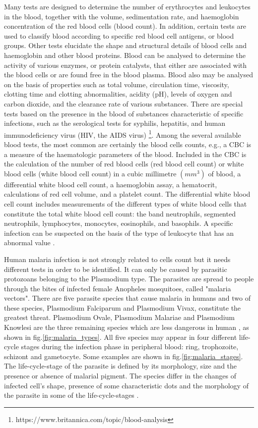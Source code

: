 \documentclass[sensors,review,submit,moreauthors,pdftex,10pt,a4paper]{mdpi}
\begin{document}
Many tests are designed to determine the number of erythrocytes and leukocytes in the blood, together with the volume, sedimentation rate, and haemoglobin concentration of the red blood cells (blood count). In addition, certain tests are used to classify blood according to specific red blood cell antigens, or blood groups. Other tests elucidate the shape and structural details of blood cells and haemoglobin and other blood proteins. Blood can be analysed to determine the activity of various enzymes, or protein catalysts, that either are associated with the blood cells or are found free in the blood plasma.
Blood also may be analysed on the basis of properties such as total volume, circulation time, viscosity, clotting time and clotting abnormalities, acidity (pH), levels of oxygen and carbon dioxide, and the clearance rate of various substances. There are special tests based on the presence in the blood of substances characteristic of specific infections, such as the serological tests for syphilis, hepatitis, and human immunodeficiency virus (HIV, the AIDS virus) \footnote{https://www.britannica.com/topic/blood-analysis}.
Among the several available blood tests, the most common are certainly the blood cells counts, e.g., a CBC is a measure of the haematologic parameters of the blood. Included in the CBC is the calculation of the number of red blood cells (red blood cell count) or white blood cells (white blood cell count) in a cubic millimetre $(mm^{3})$ of blood, a differential white blood cell count, a haemoglobin assay, a hematocrit, calculations of red cell volume, and a platelet count. The differential white blood cell count includes measurements of the different types of white blood cells that constitute the total white blood cell count: the band neutrophils, segmented neutrophils, lymphocytes, monocytes, eosinophils, and basophils. A specific infection can be suspected on the basis of the type of leukocyte that has an abnormal value \cite{DiRuberto2016}.

Human malaria infection is not strongly related to cells count but it needs different tests in order to be identified. It can only be caused by parasitic protozoans belonging to the Plasmodium type. The parasites are spread to people through the bites of infected female Anopheles mosquitoes, called "malaria vectors".
There are five parasite species that cause malaria in humans and two of these species, Plasmodium Falciparum and Plasmodium Vivax, constitute the greatest threat. Plasmodium Ovale, Plasmodium Malariae and Plasmodium Knowlesi are the three remaining species which are less dangerous in human \cite{WHO_dec_2016}, as shown in fig.\ref{fig:malaria_types}.
All five species may appear in four different life-cycle stages during the infection phase in peripheral blood: ring, trophozoite, schizont and gametocyte. Some examples are shown in fig.\ref{fig:malaria_stages}.
The life-cycle-stage of the parasite is defined by its morphology, size and the presence or absence of malarial pigment.
The species differ in the changes of infected cell's shape, presence of some characteristic dots and the morphology of the parasite in some of the life-cycle-stages \cite{Somasekar2011}.
\end{document}
